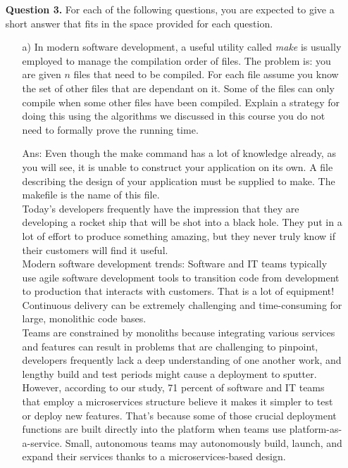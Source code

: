 \documentclass[10pt,letterpaper]{article}
\begin{document}
\begin{itemize} 
\item[{\bf Question 3.}] For each of the following questions, you are expected to
  give a short answer that fits in the space provided for each
  question.
\begin{itemize}

\item[a)] In modern software development, a useful utility called {\em make} is usually employed to manage the compilation order of files. The problem is: you are given $n$ files that need to be compiled. For each file assume you know the set of other files that are dependant on it.  Some of the files can only compile when some other files have been compiled. Explain a strategy for doing this using the algorithms we discussed in this course you do not need to formally prove the running time.
\item[Ans: ] Even though the make command has a lot of knowledge already, as you will see, it is unable to construct your application on its own. A file describing the design of your application must be supplied to make. The makefile is the name of this file.\\

Today's developers frequently have the impression that they are developing a rocket ship that will be shot into a black hole. They put in a lot of effort to produce something amazing, but they never truly know if their customers will find it useful. \\

Modern software development trends: 
Software and IT teams typically use agile software development tools to transition code from development to production that interacts with customers. That is a lot of equipment! Continuous delivery can be extremely challenging and time-consuming for large, monolithic code bases. \\

Teams are constrained by monoliths because integrating various services and features can result in problems that are challenging to pinpoint, developers frequently lack a deep understanding of one another work, and lengthy build and test periods might cause a deployment to sputter. \\

However, according to our study, 71 percent of software and IT teams that employ a microservices structure believe it makes it simpler to test or deploy new features. That's because some of those crucial deployment functions are built directly into the platform when teams use platform-as-a-service. Small, autonomous teams may autonomously build, launch, and expand their services thanks to a microservices-based design.\\


\end{itemize}
\end{itemize}
\end{document}
